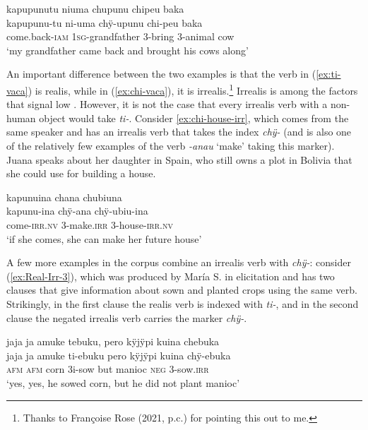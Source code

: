 \ea\label{ex:chi-vaca}
\begingl
\glpreamble kapupunutu niuma chupunu chipeu baka\\
\gla kapupunu-tu ni-uma chÿ-upunu chi-peu baka\\
\glb come.back-\textsc{iam} 1\textsc{sg}-grandfather 3-bring 3-animal cow\\
\glft ‘my grandfather came back and brought his cows along’
\endgl
\trailingcitation{[jxx-p151016l-2.259]}
\xe

An important difference between the two examples is that the verb in (\ref{ex:ti-vaca}) is realis, while in (\ref{ex:chi-vaca}), it is irrealis.\footnote{Thanks to Françoise Rose (2021, p.c.) for pointing this out to me.} Irrealis is among the factors that signal low  \citep[252]{HopperThompson1980}. However, it is not the case that every irrealis verb with a non-human object would take \textit{ti-}. Consider \ref{ex:chi-house-irr}, which comes from the same speaker and has an irrealis verb that takes the index \textit{chÿ-} (and is also one of the relatively few examples of the verb \textit{-anau} ‘make’ taking this marker). Juana speaks about her daughter in Spain, who still owns a plot in Bolivia that she could use for building a house.

\ea\label{ex:chi-house-irr}
\begingl
\glpreamble kapunuina chana chubiuna\\
\gla kapunu-ina chÿ-ana chÿ-ubiu-ina\\
\glb come-\textsc{irr.nv} 3-make.\textsc{irr} 3-house-\textsc{irr.nv}\\
\glft ‘if she comes, she can make her future house’
\endgl
\trailingcitation{[jxx-p120430l-1.298-299]}
\xe


A few more examples in the corpus combine an irrealis verb with \textit{chÿ-}: consider (\ref{ex:Real-Irr-3}), which was produced by María S. in elicitation and has two clauses that give information about sown and planted crops using the same verb. Strikingly, in the first clause the realis verb is indexed with \textit{ti-}, and in the second clause the negated irrealis verb carries the marker \textit{chÿ-}.

\ea\label{ex:Real-Irr-3}
\begingl
\glpreamble jaja ja amuke tebuku, pero kÿjÿpi kuina chebuka\\
\gla jaja ja amuke ti-ebuku pero kÿjÿpi kuina chÿ-ebuka\\
\glb \textsc{afm} \textsc{afm} corn 3i-sow but manioc \textsc{neg} 3-sow.\textsc{irr}\\
\glft ‘yes, yes, he sowed corn, but he did not plant manioc’
\endgl
\trailingcitation{[rxx-e181024l]}%
\xe

